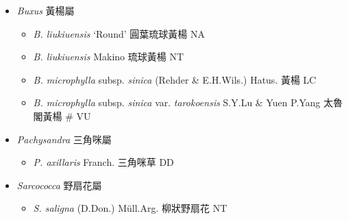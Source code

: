 
  \begin{itemize}
 \item[] \textit{Buxus} 黃楊屬
                                
  \begin{itemize}
        \item[] \textit{B. liukiuensis} ‘Round’  圓葉琉球黃楊   NA
        \item[] \textit{B. liukiuensis} Makino  琉球黃楊   NT
        \item[] \textit{B. microphylla} subsp. \textit{sinica} (Rehder \& E.H.Wils.) Hatus.  黃楊   LC
        \item[] \textit{B. microphylla} subsp. \textit{sinica} var. \textit{tarokoensis} S.Y.Lu \& Yuen P.Yang  太魯閣黃楊  \# VU
  \end{itemize}
 \item[] \textit{Pachysandra} 三角咪屬
                                
  \begin{itemize}
        \item[] \textit{P. axillaris} Franch.  三角咪草   DD
  \end{itemize}
 \item[] \textit{Sarcococca} 野扇花屬
                                
  \begin{itemize}
        \item[] \textit{S. saligna} (D.Don.) Müll.Arg.  柳狀野扇花   NT
  \end{itemize}
  \end{itemize}
